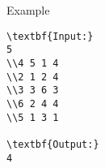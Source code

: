 Example
\begin{verbatim}
\textbf{Input:}
5 
\\4 5 1 4 
\\2 1 2 4 
\\3 3 6 3 
\\6 2 4 4 
\\5 1 3 1

\textbf{Output:}
4
\end{verbatim}